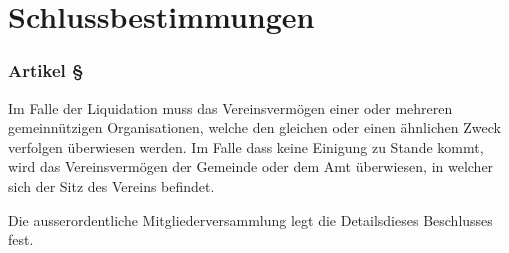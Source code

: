\section{Schlussbestimmungen}

\subsubsection*{Artikel §\articlenumber}
Im Falle der Liquidation muss das Vereinsvermögen einer oder mehreren
gemeinnützigen Organisationen, welche den gleichen oder einen ähnlichen Zweck
verfolgen überwiesen werden. Im Falle dass keine Einigung zu Stande kommt,
wird das Vereinsvermögen der Gemeinde oder dem Amt überwiesen, in welcher sich
der Sitz des Vereins befindet.

Die ausserordentliche Mitgliederversammlung legt die Detailsdieses Beschlusses
fest.
